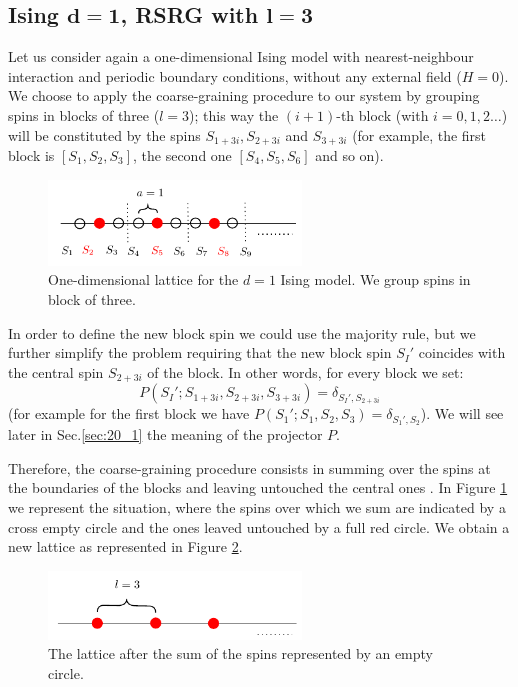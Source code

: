 \documentclass[../main/main.tex]{subfiles}
\begin{document}
\subsection{Ising \( \pmb{d=1} \), RSRG with \( \pmb{l=3} \) }
Let us consider again a one-dimensional Ising model with nearest-neighbour interaction and periodic boundary conditions, without any external field (\( H=0 \)). We choose to apply the coarse-graining procedure to our system by grouping spins in blocks of three (\( l=3 \)); this way the \( (i+1) \)-th  block (with \( i=0,1,2\dots \)) will be constituted by the spins \( S_{1+3i}, S_{2+3i} \) and \( S_{3+3i} \) (for example, the first block is \( [S_1,S_2,S_3] \), the second one \( [S_4,S_5,S_6] \) and so on).

\begin{figure}[h!]
\centering
\includegraphics[width=0.6\textwidth]{../lessons/20_image/1.pdf}
\caption{\label{fig:20_1} One-dimensional lattice for the \( d=1 \) Ising model. We group spins in block of three.}
\end{figure}

In order to define the new block spin we could use the majority rule, but we further simplify the problem requiring that the new block spin \( S_I' \) coincides with the central spin \(  S_{2+3i} \) of the block.  In other words, for every block we set:
\begin{equation*}
  P(S_{I}';S_{1+3i},S_{2+3i},S_{3+3i})=\delta _{S_{I}',S_{2+3i}}
\end{equation*}
(for example for the first block we have \( P(S_{1}';S_{1},S_{2},S_{3})=\delta _{S_{1}',S_{2}} \)). We will see later in Sec.\ref{sec:20_1} the meaning of the projector \( P \).

Therefore, the coarse-graining procedure consists in summing over the spins at the boundaries of the blocks and leaving untouched the central ones . In Figure \ref{fig:20_1} we represent the situation, where the spins over which we sum are indicated by a cross empty circle and the ones leaved untouched by a full red circle.
We obtain a new lattice as represented in Figure \ref{fig:20_2}.


\begin{figure}[h!]
\centering
\includegraphics[width=0.6\textwidth]{../lessons/20_image/2.pdf}
\caption{\label{fig:20_2} The lattice after the sum of the spins represented by an empty circle.}
\end{figure}
\end{document}
